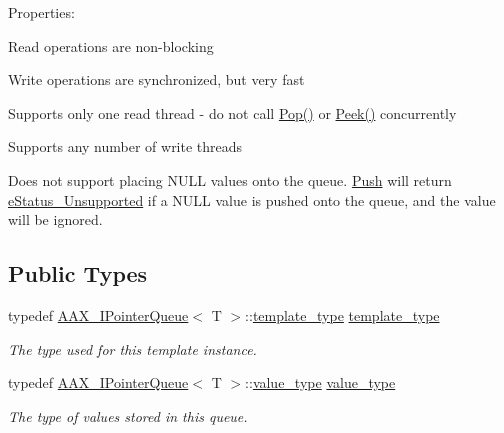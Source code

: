 Properties\+:
\begin{DoxyItemize}
\item Read operations are non-\/blocking
\item Write operations are synchronized, but very fast
\item Supports only one read thread -\/ do not call \mbox{\hyperlink{a01441_a0c64180813c16b4952761f82e32d7edd}{Pop()}} or \mbox{\hyperlink{a01441_a0b732544b0bcdd59acfca7fac5dca984}{Peek()}} concurrently
\item Supports any number of write threads
\item Does not support placing {\ttfamily N\+U\+LL} values onto the queue. \mbox{\hyperlink{a01441_a2304d6ba1f1026b6a42de48056ab3050}{Push}} will return \mbox{\hyperlink{a01785_aea020100f0b06636ce7cb25c2fdb0af7a1585c38bb587c4adcadefbe3823ee9f8}{e\+Status\+\_\+\+Unsupported}} if a {\ttfamily N\+U\+LL} value is pushed onto the queue, and the value will be ignored. 
\end{DoxyItemize}\subsection*{Public Types}
\begin{DoxyCompactItemize}
\item 
typedef \mbox{\hyperlink{a01861}{A\+A\+X\+\_\+\+I\+Pointer\+Queue}}$<$ T $>$\+::\mbox{\hyperlink{a01441_aae36349d9419de62ce8e74b397749c27}{template\+\_\+type}} \mbox{\hyperlink{a01441_aae36349d9419de62ce8e74b397749c27}{template\+\_\+type}}
\begin{DoxyCompactList}\small\item\em The type used for this template instance. \end{DoxyCompactList}\item 
typedef \mbox{\hyperlink{a01861}{A\+A\+X\+\_\+\+I\+Pointer\+Queue}}$<$ T $>$\+::\mbox{\hyperlink{a01441_acbb95bad3be34c7e4c770bc8c455c252}{value\+\_\+type}} \mbox{\hyperlink{a01441_acbb95bad3be34c7e4c770bc8c455c252}{value\+\_\+type}}
\begin{DoxyCompactList}\small\item\em The type of values stored in this queue. \end{DoxyCompactList}\end{DoxyCompactItemize}
